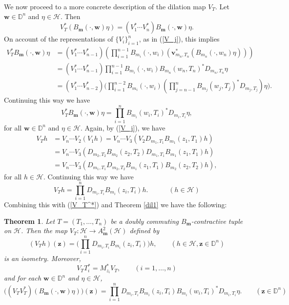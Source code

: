 \documentclass[12pt]{amsart}
\newtheorem{Theorem}{\sc Theorem}[section]
\begin{document}
We now proceed to a more concrete description of the dilation map
$V_T$.  Let ${\bm{w}} \in {\mathbb{D}}^n$ and $\eta \in {\mathcal{H}}$. Then \[V_T^*
(B_{\bm{m}}(\cdot, {\bm{w}}) \eta) = (V_1^* \cdots V_n^*)B_{\bm{m}}(\cdot, {\bm{w}})
\eta.\]On account of the representations of $\{V_i\}_{i=1}^n$, as in
(\ref{V_j}), this implies
\[\begin{split}V_T^* B_{\bm{m}}(\cdot, {\bm{w}}) \eta & = (V_1^* \cdots V_{n-1}^*)
(\prod_{i=1}^{n-1} B_{m_i}(\cdot, w_i) (
{\bm{v}}_{m_n, T_n}^* (B_{m_n}(\cdot, w_n) \eta)))\\
& = (V_1^* \cdots V_{n-1}^*)\prod_{i=1}^{n-1} B_{m_i}(\cdot, w_i)
B_{m_n}(w_n, T_n)^* D_{m_n, T_n} \eta
\\ & = (V_1^* \cdots V_{n-2}^*) \Big(\prod_{i=1}^{n-2} B_{m_i}(\cdot, w_i)
(\prod_{j=n-1}^n B_{m_j}(w_j, T_j)^* D_{m_j, T_j})
\eta\Big).\end{split}\]Continuing this way we have
\begin{equation}\label{V_T^*} V_T^* B_{\bm{m}}(\cdot, {\bm{w}}) \eta =
\prod_{i=1}^{n} B_{m_i}(w_i, T_i)^* D_{m_i, T_i}
\eta,\end{equation}for all ${\bm{w}} \in {\mathbb{D}}^n$ and $\eta \in {\mathcal{H}}$. Again,
by (\ref{V_j}), we have
\[\begin{split}V_T h & = V_n \cdots V_2 (V_1 h)= V_n \cdots
V_3(V_2 D_{m_1, T_1} B_{m_1}(z_1, T_1) h)\\ & =  V_n \cdots
V_3(D_{m_2, T_2} B_{m_2}(z_2, T_2) D_{m_1, T_1} B_{m_1}(z_1, T_1)
h)\\ & = V_n \cdots V_3(D_{m_1, T_1} D_{m_2, T_2} B_{m_1}(z_1, T_1)
B_{m_2}(z_2, T_2) h),
\end{split}\]for all $h \in {\mathcal{H}}$. Continuing this way we have \begin{equation}\label{VT} V_T
h = \prod_{i=1}^n D_{m_i, T_i} B_{m_i}(z_i, T_i)h.\quad \quad \quad
(h \in {\mathcal{H}}) \end{equation} Combining this with (\ref{V_T^*}) and
Theorem \ref{dil1} we have the following:

\begin{Theorem}\label{VTVT*}
Let $T = (T_1, \ldots, T_n)$ be a doubly commuting
$B_{\bm{m}}$-contractive tuple on ${\mathcal{H}}$. Then the map $V_T : {\mathcal{H}} {\rightarrow}
A^2_{\bm{m}}({\mathcal{H}})$ defined by
\[(V_Th)({\bm{z}}) = \Big(\prod_{i=1}^n D_{m_i, T_i} B_{m_i}(z_i, T_i)
\Big)h, \quad \quad (h \in {\mathcal{H}}, {\bm{z}} \in {\mathbb{D}}^n)\]is an isometry.
Moreover, \[V_T T_i^* = M_{z_i}^* V_T, \quad \quad (i = 1, \ldots,
n)\]and for each ${\bm{w}} \in {\mathbb{D}}^n$ and $\eta \in {\mathcal{H}}$, \[\Big((V_T
V_T^*) (B_{\bm{m}}(\cdot, {\bm{w}}) \eta)\Big)({\bm{z}}) = \prod_{i=1}^n D_{m_i,
T_i} B_{m_i}(z_i, T_i) B_{m_i}(w_i, T_i)^* D_{m_i, T_i} \eta. \quad
\quad ({\bm{z}} \in {\mathbb{D}}^n)\]
\end{Theorem}
\end{document}

